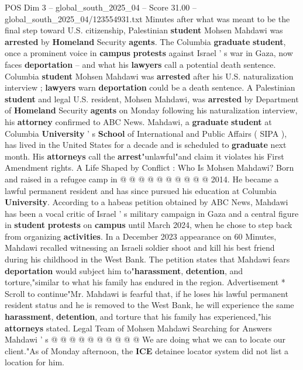 \begin{textsample}{POS Dim 3 – global\_south\_2025\_04 – Score 31.00 – global\_south\_2025\_04/123554931.txt}  \label{ex:f3_pos_111}
Minutes after what was meant to be the final step toward U.S. citizenship, Palestinian \textbf{student} Mohsen Mahdawi was \textbf{arrested} by \textbf{Homeland} Security \textbf{agents}.
The Columbia \textbf{graduate} \textbf{student}, once a prominent voice in \textbf{campus} \textbf{protests} against Israel ' s war in Gaza, now faces \textbf{deportation} -- and what his \textbf{lawyers} call a potential death sentence.
Columbia \textbf{student} Mohsen Mahdawi was \textbf{arrested} after his U.S. naturalization interview ; \textbf{lawyers} warn \textbf{deportation} could be a death sentence.
A Palestinian \textbf{student} and legal U.S. resident, Mohsen Mahdawi, was \textbf{arrested} by Department of \textbf{Homeland} Security \textbf{agents} on Monday following his naturalization interview, his \textbf{attorney} confirmed to ABC News.
Mahdawi, a \textbf{graduate} \textbf{student} at Columbia \textbf{University} ' s \textbf{School} of International and Public Affairs ( SIPA ), has lived in the United States for a decade and is scheduled to \textbf{graduate} next month.
His \textbf{attorneys} call the \textbf{arrest}"unlawful"and claim it violates his First Amendment rights.
A Life Shaped by Conflict : Who Is Mohsen Mahdawi?
Born and raised in a refugee camp in @ @ @ @ @ @ @ @ @ @ 2014.
He became a lawful permanent resident and has since pursued his education at Columbia \textbf{University}.
According to a habeas petition obtained by ABC News, Mahdawi has been a vocal critic of Israel ' s military campaign in Gaza and a central figure in \textbf{student} \textbf{protests} on \textbf{campus} until March 2024, when he chose to step back from organizing \textbf{activities}.
In a December 2023 appearance on 60 Minutes, Mahdawi recalled witnessing an Israeli soldier shoot and kill his best friend during his childhood in the West Bank.
The petition states that Mahdawi fears \textbf{deportation} would subject him to"\textbf{harassment}, \textbf{detention}, and torture,"similar to what his family has endured in the region.
Advertisement * Scroll to continue"Mr.
Mahdawi is fearful that, if he loses his lawful permanent resident status and he is removed to the West Bank, he will experience the same \textbf{harassment}, \textbf{detention}, and torture that his family has experienced,"his \textbf{attorneys} stated.
Legal Team of Mohsen Mahdawi Searching for Answers Mahdawi ' s @ @ @ @ @ @ @ @ @ @ We are doing what we can to locate our client."As of Monday afternoon, the \textbf{ICE} detainee locator system did not list a location for him.

\end{textsample}
